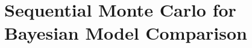 \chapter{Sequential Monte Carlo for Bayesian Model Comparison}
\label{cha:Sequential Monte Carlo for Bayesian Model Comparison}
